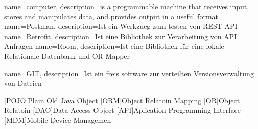 {
  name=computer,
  description={is a programmable machine that receives input,
               stores and manipulates data, and provides
               output in a useful format}
}
{
	name=Postman,
	description={Ist ein Werkzueg zum testen von REST API}
}
{
	name=Retrofit,
	description={Ist eine Bibliothek zur Verarbeitung von API Anfragen}
}
{
	name=Room,
	description={Ist eine Bibliothek für eine lokale Relationale Datenbank und OR-Mapper}
}


{
	name=GIT,
	description={Ist ein freis software zur verteilten Versionsverwaltung von Dateien}
}

\begin{acronym}
	[POJO]{Plain Old Java Object}
	[ORM]{Object Relatoin Mapping}
	[OR]{Object Relatoin}
	[DAO]{Data Access Object}
	[API]{Aplication Programming Interface}
	[MDM]{Mobile-Device-Managemen}
	
	
\end{acronym}